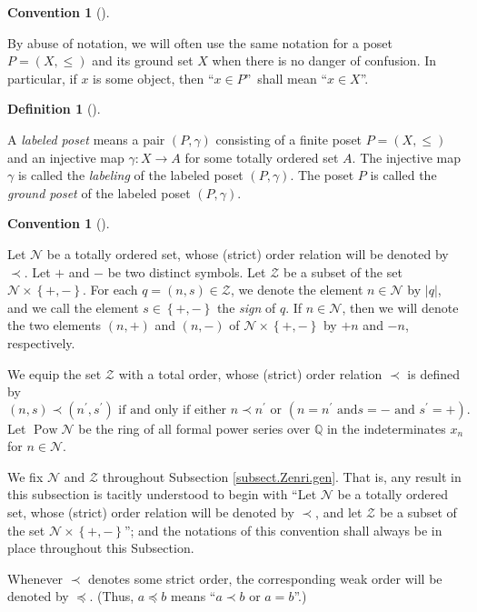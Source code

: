 \documentclass[numbers=enddot,12pt,final,onecolumn,notitlepage]{scrartcl}%
\theoremstyle{definition}
\newtheorem{defi}[theo]{Definition}
\newenvironment{definition}[1][]
{\begin{defi}[#1]\begin{leftbar}}
{\end{leftbar}\end{defi}}
\newtheorem{conv}[theo]{Convention}
\newenvironment{convention}[1][]
{\begin{conv}[#1]\begin{leftbar}}
{\end{leftbar}\end{conv}}
\newenvironment{convention}[1][Convention]{\noindent\textbf{#1.} }{\ \rule{0.5em}{0.5em}}
\begin{document}
\begin{convention}
By abuse of notation, we will often use the same notation for a poset
$P=\left(  X,\leq\right)  $ and its ground set $X$ when there is no danger of
confusion. In particular, if $x$ is some object, then \textquotedblleft$x\in
P$\textquotedblright\ shall mean \textquotedblleft$x\in X$\textquotedblright.
\end{convention}

\begin{definition}
A \textit{labeled poset} means a pair $\left(  P,\gamma\right)  $ consisting
of a finite poset $P=\left(  X,\leq\right)  $ and an injective map
$\gamma:X\rightarrow A$ for some totally ordered set $A$. The injective map
$\gamma$ is called the \textit{labeling} of the labeled poset $\left(
P,\gamma\right)  $. The poset $P$ is called the \textit{ground poset} of the
labeled poset $\left(  P,\gamma\right)  $.
\end{definition}

\begin{convention}
Let $\mathcal{N}$ be a totally ordered set, whose (strict) order relation will
be denoted by $\prec$. Let $+$ and $-$ be two distinct symbols. Let
$\mathcal{Z}$ be a subset of the set $\mathcal{N}\times\left\{  +,-\right\}
$. For each $q=\left(  n,s\right)  \in\mathcal{Z}$, we denote the element
$n\in\mathcal{N}$ by $\left\vert q\right\vert $, and we call the element
$s\in\left\{  +,-\right\}  $ the \textit{sign} of $q$. If $n\in\mathcal{N}$,
then we will denote the two elements $\left(  n,+\right)  $ and $\left(
n,-\right)  $ of $\mathcal{N}\times\left\{  +,-\right\}  $ by $+n$ and $-n$, respectively.

We equip the set $\mathcal{Z}$ with a total order, whose (strict) order
relation $\prec$ is defined by%
\[
\left(  n,s\right)  \prec\left(  n^{\prime},s^{\prime}\right)  \text{ if and
only if either }n\prec n^{\prime}\text{ or }\left(  n=n^{\prime}\text{ and
}s=-\text{ and }s^{\prime}=+\right)  .
\]
Let $\operatorname*{Pow}\mathcal{N}$ be the ring of all formal power series
over $\mathbb{Q}$ in the indeterminates $x_{n}$ for $n\in\mathcal{N}$.

We fix $\mathcal{N}$ and $\mathcal{Z}$ throughout Subsection
\ref{subsect.Zenri.gen}. That is, any result in this subsection is tacitly
understood to begin with \textquotedblleft Let $\mathcal{N}$ be a totally
ordered set, whose (strict) order relation will be denoted by $\prec$, and let
$\mathcal{Z}$ be a subset of the set $\mathcal{N}\times\left\{  +,-\right\}
$\textquotedblright; and the notations of this convention shall always be
in place throughout this Subsection.

Whenever $\prec$ denotes some strict order, the corresponding weak order will
be denoted by $\preccurlyeq$. (Thus, $a \preccurlyeq b$ means ``$a \prec b$ or
$a = b$''.)
\end{convention}
\end{document}
